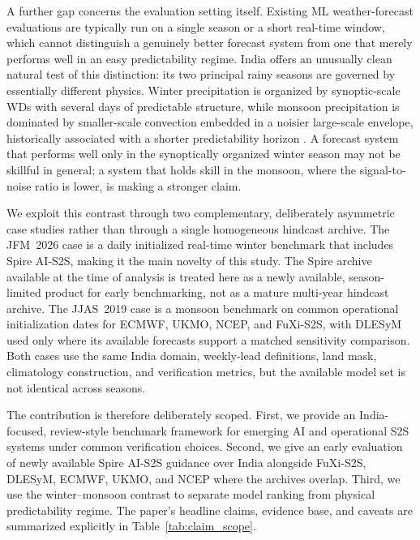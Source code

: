 \documentclass[11pt,a4paper]{article}
\begin{document}
A further gap concerns the evaluation setting itself. Existing ML
weather-forecast evaluations are typically run on a single season or a short
real-time window, which cannot distinguish a genuinely better forecast system
from one that merely performs well in an easy predictability regime. India
offers an unusually clean natural test of this distinction: its two principal
rainy seasons are governed by essentially different physics. Winter
precipitation is organized by synoptic-scale WDs with several days of
predictable structure, while monsoon precipitation is dominated by
smaller-scale convection embedded in a noisier large-scale envelope, historically
associated with a shorter predictability horizon
\citep{deandrade2019,pegion2019}. A forecast system that performs well only in
the synoptically organized winter season may not be skillful in general; a
system that holds skill in the monsoon, where the signal-to-noise ratio is
lower, is making a stronger claim.

We exploit this contrast through two complementary, deliberately asymmetric
case studies rather than through a single homogeneous hindcast archive. The
JFM~2026 case is a daily initialized real-time winter benchmark that includes
Spire AI-S2S, making it the main novelty of this study. The Spire archive
available at the time of analysis is treated here as a newly available,
season-limited product for early benchmarking, not as a mature multi-year
hindcast archive. The JJAS~2019 case is a
monsoon benchmark on common operational initialization dates for ECMWF, UKMO,
NCEP, and FuXi-S2S, with DLESyM used only where its available forecasts support
a matched sensitivity comparison. Both cases use the same India domain,
weekly-lead definitions, land mask, climatology construction, and verification
metrics, but the available model set is not identical across seasons.

The contribution is therefore deliberately scoped. First, we provide an
India-focused, review-style benchmark framework for emerging AI and
operational S2S systems under common verification choices. Second, we give an
early evaluation of newly available Spire AI-S2S guidance over India alongside
FuXi-S2S, DLESyM, ECMWF, UKMO, and NCEP where the archives overlap. Third, we
use the winter--monsoon contrast to separate model ranking from physical
predictability regime. The paper's headline claims, evidence base, and caveats
are summarized explicitly in Table~\ref{tab:claim_scope}.
\end{document}
